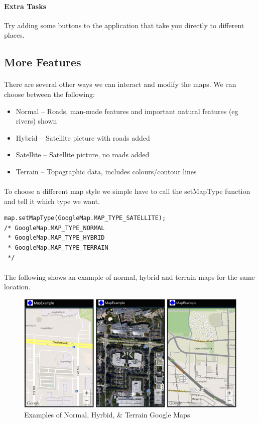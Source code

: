 \paragraph{Extra Tasks} Try adding some buttons to the application that take you directly to different places.

\subsection{More Features}

\paragraph{} There are several other ways we can interact and modify the maps.  We can choose between the following:

\begin{itemize}
\item Normal – Roads, man-made features and important natural features (eg rivers) shown
\item Hybrid – Satellite picture with roads added
\item Satellite – Satellite picture, no roads added
\item Terrain – Topographic data, includes colours/contour lines
\end{itemize}

\paragraph{} To choose a different map style we simple have to call the setMapType function and tell it which type we want.

\begin{lstlisting}
map.setMapType(GoogleMap.MAP_TYPE_SATELLITE);
/* GoogleMap.MAP_TYPE_NORMAL
 * GoogleMap.MAP_TYPE_HYBRID
 * GoogleMap.MAP_TYPE_TERRAIN
 */
\end{lstlisting}

\paragraph{} The following shows an example of normal, hybrid and terrain maps for the same location.

\begin{figure}[H]%
\centering
\includegraphics[width=\textwidth]{images/normal-hybrid-terrain-map-examples}
\caption{Examples of Normal, Hyrbid, \& Terrain Google Maps}
\label{fig:normal-hybrid-terrain-map-examples}
\end{figure}

